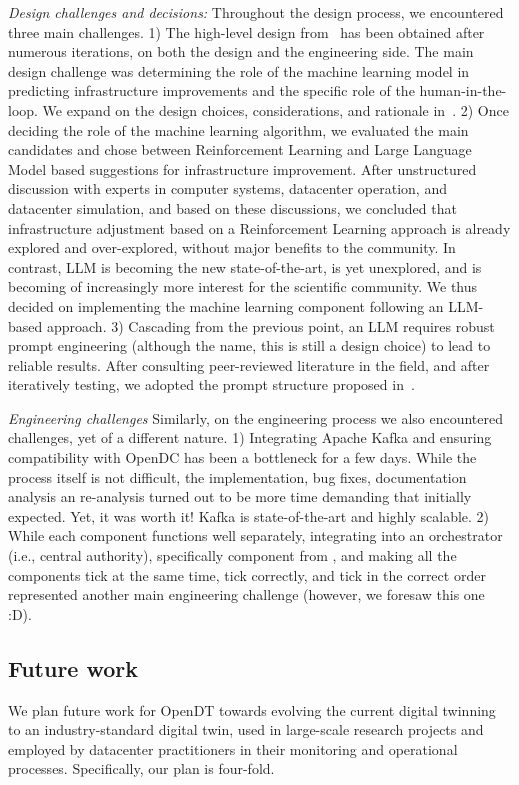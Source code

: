 \textit{Design challenges and decisions:} Throughout the design process, we encountered three main challenges. 
1) The high-level design from~ has been obtained after numerous iterations, on both the design and the engineering side. The main design challenge was determining the role of the machine learning model in predicting infrastructure improvements and the specific role of the human-in-the-loop. We expand on the design choices, considerations, and rationale in~.
2) Once deciding the role of the machine learning algorithm, we evaluated the main candidates and chose between Reinforcement Learning and Large Language Model based suggestions for infrastructure improvement. After unstructured discussion with experts in computer systems, datacenter operation, and datacenter simulation, and based on these discussions, we concluded that infrastructure adjustment based on a Reinforcement Learning approach is already explored and over-explored, without major benefits to the community. In contrast, LLM is becoming the new state-of-the-art, is yet unexplored, and is becoming of increasingly more interest for the scientific community. We thus decided on implementing the machine learning component following  an LLM-based approach.
3) Cascading from the previous point, an LLM requires robust prompt engineering (although the name, this is still a design choice) to lead to reliable results. After consulting peer-reviewed literature in the field, and after iteratively testing, we adopted the prompt structure proposed in~.

\textit{Engineering challenges} Similarly, on the engineering process we also encountered challenges, yet of a different nature.
1) Integrating Apache Kafka and ensuring compatibility with OpenDC has been a bottleneck for a few days. While the process itself is not difficult, the implementation, bug fixes, documentation analysis an re-analysis turned out to be more time demanding that initially expected. Yet, it was worth it! Kafka is state-of-the-art and highly scalable.
2) While each component functions well separately, integrating into an orchestrator (i.e., central authority), specifically component  from , and making all the components tick at the same time, tick correctly, and tick in the correct order represented another main engineering challenge (however, we foresaw this one :D). 


\subsection{Future work}\label{sec:reflection:challenges}
We plan future work for OpenDT towards evolving the current digital twinning to an industry-standard digital twin, used in large-scale research projects and employed by datacenter practitioners in their monitoring and operational processes. Specifically, our plan is four-fold.

